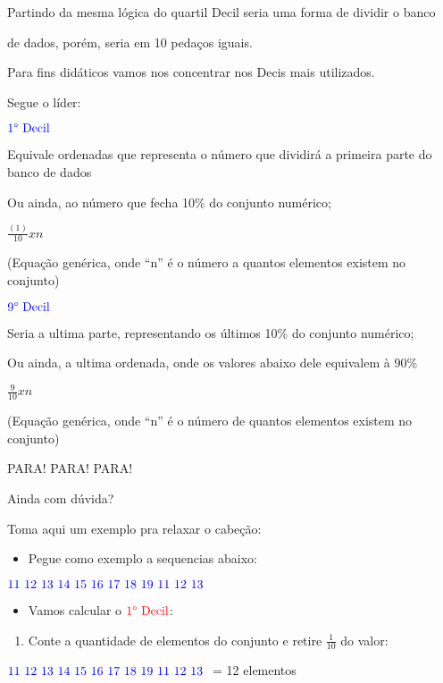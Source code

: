 \documentclass[]{book}
\providecommand{\tightlist}{%
  \setlength{\itemsep}{0pt}\setlength{\parskip}{0pt}}
\begin{document}
Partindo da mesma lógica do quartil Decil seria uma forma de dividir o banco

de dados, porém, seria em 10 pedaços iguais.

Para fins didáticos vamos nos concentrar nos Decis mais utilizados.

Segue o líder:

\(\color{blue}{\text{1° Decil}}\)

Equivale ordenadas que representa o número que dividirá a primeira parte do banco de dados

Ou ainda, ao número que fecha 10\% do conjunto numérico;

\(\frac{( 1 )}{10} x n\)

(Equação genérica, onde ``n'' é o número a quantos elementos existem no conjunto)

\(\color{blue}{\text{9° Decil}}\)

Seria a ultima parte, representando os últimos 10\% do conjunto numérico;

Ou ainda, a ultima ordenada, onde os valores abaixo dele equivalem à 90\%

\(\frac{9}{10} x n\)

(Equação genérica, onde ``n'' é o número de quantos elementos existem no conjunto)

PARA! PARA! PARA!

Ainda com dúvida?

Toma aqui um exemplo pra relaxar o cabeção:

\begin{itemize}
\tightlist
\item
  Pegue como exemplo a sequencias abaixo:
\end{itemize}

\(\color{blue}{\text{11 12 13 14 15 16 17 18 19 11 12 13}}\)

\begin{itemize}
\tightlist
\item
  Vamos calcular o \(\color{red}{\text{1° Decil}}\):
\end{itemize}

\begin{enumerate}
\def\labelenumi{\arabic{enumi}.}
\tightlist
\item
  Conte a quantidade de elementos do conjunto e retire \(\frac{1}{10}\) do valor:
\end{enumerate}

\(\color{blue}{\text{11 12 13 14 15 16 17 18 19 11 12 13 }}\) = 12 elementos
\end{document}
